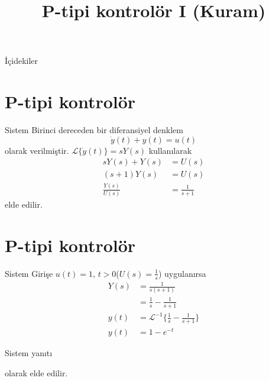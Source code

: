 
\title[Ders 9] {P-tipi kontrolör I (Kuram)}

\frame{\titlepage}
\begin{frame}[fragile]{İçidekiler}
    \tableofcontents
\end{frame}
\section{P-tipi kontrolör}
\begin{frame}[fragile]{Sistem}
    Birinci dereceden bir diferansiyel denklem
    \begin{equation}
        \dot{y}(t)+y(t)=u(t)
    \end{equation}
    olarak verilmiştir. $\mathcal{L}\{\dot{y}(t)\}=sY(s)$ kullanılarak
    \begin{equation}
    \begin{split}
        sY(s)+Y(s)&=U(s)\\
        (s+1)Y(s)&=U(s)\\
        \frac{Y(s)}{U(s)}&=\frac{1}{s+1}
    \end{split}
    \end{equation}
    elde edilir.
\end{frame}
\section{P-tipi kontrolör}
\begin{frame}[fragile]{Sistem}
    Girişe $u(t)=1,\,t>0$($U(s)=\frac{1}{s}$) uygulanırsa
    \begin{equation}
    \begin{split}
        Y(s)&=\frac{1}{s(s+1)}\\
        &=\frac{1}{s}-\frac{1}{s+1}\\
        y(t)&=\mathcal{L}^{-1}\{\frac{1}{s}-\frac{1}{s+1}\}\\
        y(t)&=1-e^{-t}
    \end{split}
    \end{equation}
\end{frame}
\begin{frame}[fragile]{Sistem yanıtı}
    \begin{figure}[!h]
        \centering
    \end{figure}
    olarak elde edilir.
\end{frame}
